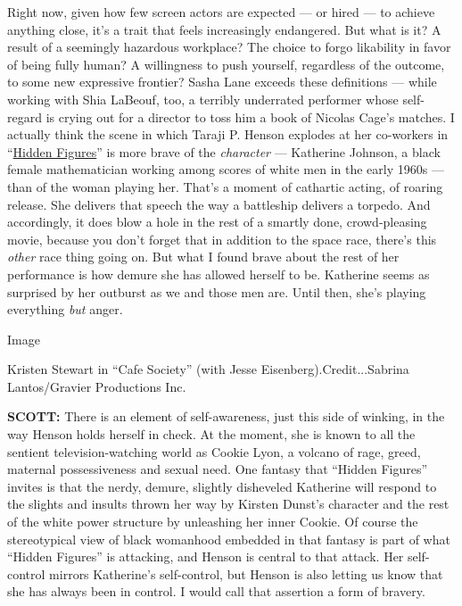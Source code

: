 Right now, given how few screen actors are expected --- or hired --- to
achieve anything close, it's a trait that feels increasingly endangered.
But what is it? A result of a seemingly hazardous workplace? The choice
to forgo likability in favor of being fully human? A willingness to push
yourself, regardless of the outcome, to some new expressive frontier?
Sasha Lane exceeds these definitions --- while working with Shia
LaBeouf, too, a terribly underrated performer whose self-regard is
crying out for a director to toss him a book of Nicolas Cage's matches.
I actually think the scene in which Taraji P. Henson explodes at her
co-workers in
``\href{https://www.nytimes3xbfgragh.onion/2016/05/22/movies/taraji-p-henson-octavia-spencer-hidden-figures-rocket-science-and-race.html}{Hidden
Figures}'' is more brave of the \emph{character} --- Katherine Johnson,
a black female mathematician working among scores of white men in the
early 1960s --- than of the woman playing her. That's a moment of
cathartic acting, of roaring release. She delivers that speech the way a
battleship delivers a torpedo. And accordingly, it does blow a hole in
the rest of a smartly done, crowd-pleasing movie, because you don't
forget that in addition to the space race, there's this \emph{other}
race thing going on. But what I found brave about the rest of her
performance is how demure she has allowed herself to be. Katherine seems
as surprised by her outburst as we and those men are. Until then, she's
playing everything \emph{but} anger.

Image

Kristen Stewart in ``Cafe Society'' (with Jesse
Eisenberg).Credit...Sabrina Lantos/Gravier Productions Inc.

\textbf{SCOTT:} There is an element of self-awareness, just this side of
winking, in the way Henson holds herself in check. At the moment, she is
known to all the sentient television-watching world as Cookie Lyon, a
volcano of rage, greed, maternal possessiveness and sexual need. One
fantasy that ``Hidden Figures'' invites is that the nerdy, demure,
slightly disheveled Katherine will respond to the slights and insults
thrown her way by Kirsten Dunst's character and the rest of the white
power structure by unleashing her inner Cookie. Of course the
stereotypical view of black womanhood embedded in that fantasy is part
of what ``Hidden Figures'' is attacking, and Henson is central to that
attack. Her self-control mirrors Katherine's self-control, but Henson is
also letting us know that she has always been in control. I would call
that assertion a form of bravery.

